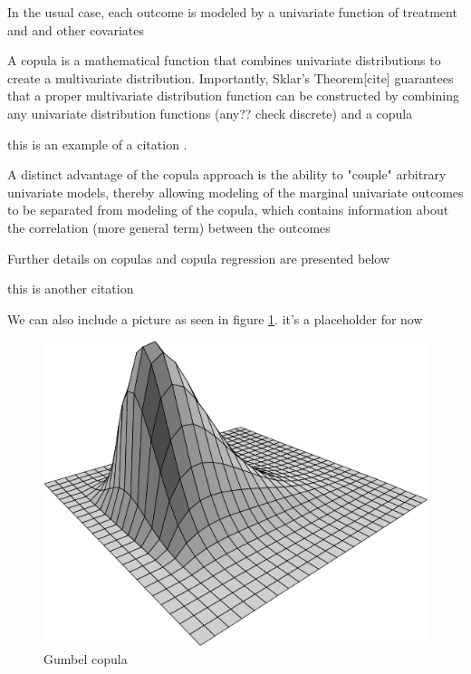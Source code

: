 In the usual case, each outcome is modeled by a univariate function of treatment and and other covariates

A copula is a mathematical function that combines univariate distributions to create a multivariate distribution. Importantly, Sklar's Theorem[cite] guarantees that a proper multivariate distribution function can be constructed by combining any univariate distribution functions (any?? check discrete) and a copula 

this is an example of a citation \cite{nelsen_introduction_2006}.

A distinct advantage of the copula approach is the ability to "couple" arbitrary univariate models, thereby allowing modeling of the marginal univariate outcomes to be separated from modeling of the copula, which contains information about the correlation (more general term) between the outcomes

Further details on copulas and copula regression are presented below 

this is another citation \cite{joe_dependence_2015}

We can also include a picture as seen in figure \ref{Fi:gumbel_cop}. it's a placeholder for now

\begin{figure}
\begin{center}
\includegraphics[scale=.4]{fig/gumbel_cop}
\caption{Gumbel copula}
\label{Fi:gumbel_cop}
\end{center}
\end{figure}

